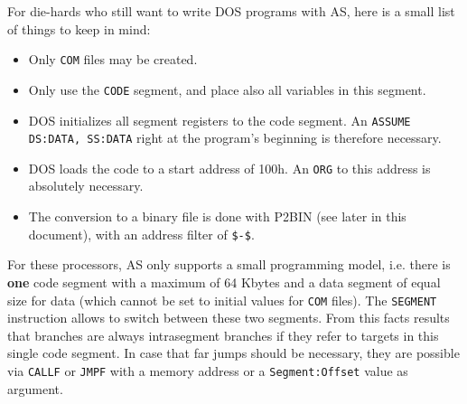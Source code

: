 \documentclass[12pt,twoside]{report}
\newcommand{\bb}[1]{{\bf #1}}
\newcommand{\tty}[1]{{\tt #1}}
\begin{document}
For die-hards who still want to write DOS programs with AS, here is a
small list of things to keep in mind:
\begin{itemize}
\item{Only \tty{COM} files may be created.}
\item{Only use the \tty{CODE} segment, and place also all variables in
      this segment.}
\item{DOS initializes all segment registers to the code segment.
      An \tty{ASSUME DS:DATA, SS:DATA} right at the program's beginning
      is therefore necessary.}
\item{DOS loads the code to a start address of 100h.  An \tty{ORG} to this
      address is absolutely necessary.}
\item{The conversion to a binary file is done with P2BIN (see later in
      this document), with an address filter of \tty{\$-\$}.}
\end{itemize}
For these processors, AS only supports a small programming model, i.e.
there is \bb{one} code segment with a maximum of 64 Kbytes and a data
segment of equal size for data (which cannot be set to initial values for
\tty{COM} files).  The \tty{SEGMENT} instruction allows to switch between
these two segments.  From this facts results that branches are always
intrasegment branches if they refer to targets in this single code
segment.  In case that far jumps should be necessary, they are possible
via \tty{CALLF} or \tty{JMPF} with a memory address or a
\tty{Segment:Offset} value as argument.
\end{document}
